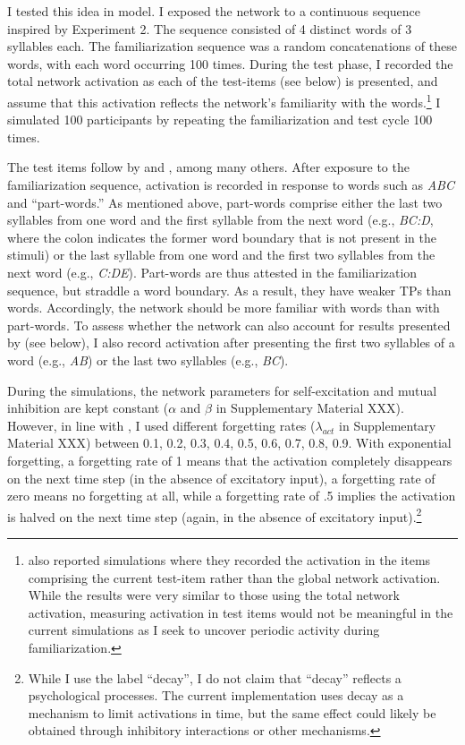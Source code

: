 \documentclass[
]{article}
\begin{document}
I tested this idea in \citep{Endress-TP-Model} model. I exposed the
network to a continuous sequence inspired by \citep{Saffran-Science}
Experiment 2. The sequence consisted of 4 distinct words of 3 syllables
each. The familiarization sequence was a random concatenations of these
words, with each word occurring 100 times. During the test phase, I
recorded the total network activation as each of the test-items (see
below) is presented, and assume that this activation reflects the
network's familiarity with the words.\footnote{\citep{Endress-TP-Model}
  also reported simulations where they recorded the activation in the
  items comprising the current test-item rather than the global network
  activation. While the results were very similar to those using the
  total network activation, measuring activation in test items would not
  be meaningful in the current simulations as I seek to uncover periodic
  activity during familiarization.} I simulated 100 participants by
repeating the familiarization and test cycle 100 times.

The test items follow by \citep{Saffran-Science} and
\citep{Saffran1996b}, among many others. After exposure to the
familiarization sequence, activation is recorded in response to words
such as \emph{ABC} and ``part-words.'' As mentioned above, part-words
comprise either the last two syllables from one word and the first
syllable from the next word (e.g., \emph{BC:D}, where the colon
indicates the former word boundary that is not present in the stimuli)
or the last syllable from one word and the first two syllables from the
next word (e.g., \emph{C:DE}). Part-words are thus attested in the
familiarization sequence, but straddle a word boundary. As a result,
they have weaker TPs than words. Accordingly, the network should be more
familiar with words than with part-words. To assess whether the network
can also account for results presented by \citep{Flo2022} (see below), I
also record activation after presenting the first two syllables of a
word (e.g., \emph{AB}) or the last two syllables (e.g., \emph{BC}).

During the simulations, the network parameters for self-excitation and
mutual inhibition are kept constant (\(\alpha\) and \(\beta\) in
Supplementary Material XXX). However, in line with
\citep{Endress-TP-Model}, I used different forgetting rates
(\(\lambda_{act}\) in Supplementary Material XXX) between 0.1, 0.2, 0.3,
0.4, 0.5, 0.6, 0.7, 0.8, 0.9. With exponential forgetting, a forgetting
rate of 1 means that the activation completely disappears on the next
time step (in the absence of excitatory input), a forgetting rate of
zero means no forgetting at all, while a forgetting rate of .5 implies
the activation is halved on the next time step (again, in the absence of
excitatory input).\footnote{While I use the label ``decay'', I do not
  claim that ``decay'' reflects a psychological processes. The current
  implementation uses decay as a mechanism to limit activations in time,
  but the same effect could likely be obtained through inhibitory
  interactions or other mechanisms.}
\end{document}
